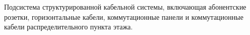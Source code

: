 Подсистема структурированной кабельной системы, включающая
абонентские розетки, горизонтальные кабели,
коммутационные панели и коммутационные кабели
распределительного пункта этажа.